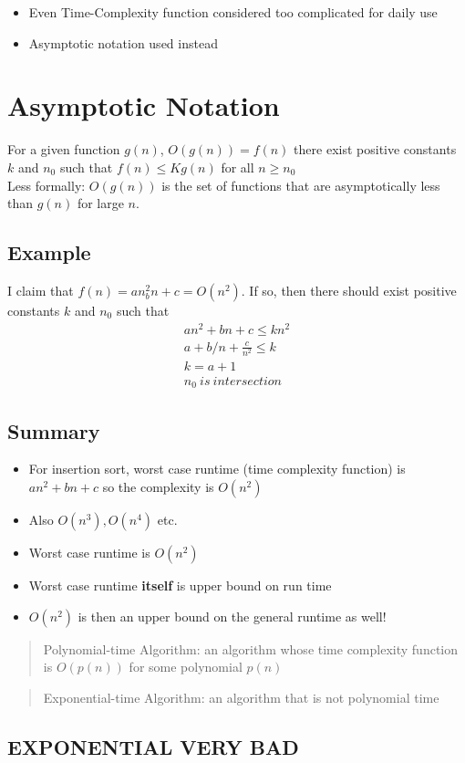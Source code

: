 \documentclass[12pt, letter]{article}
\begin{document}
\begin{itemize}
	\item Even Time-Complexity function considered too complicated for daily use
	\item Asymptotic notation used instead
\end{itemize}

\section{Asymptotic Notation}%
\label{sec:asymptotic_notation}
For a given function $g(n)$, $O(g(n))=f(n)$ there exist positive constants $k$ and  $n_0$ such that  $f(n) \le Kg(n)$ for all  $n \ge n_0$ \\
Less formally: $O(g(n))$ is the set of functions that are asymptotically less than $g(n)$ for large  $n$.

\subsection*{Example}
I claim that $f(n) = an^2_bn+c = O(n^2) $. If so, then there should exist positive constants $k$ and  $n_0$ such that
\begin{gather*}
an^2+bn+c \le kn^2 \\
a+b/n +\frac{c}{n^2} \le k \\
k = a+1 \\
n_0\ is\ intersection
\end{gather*}

\subsection*{Summary}
\begin{itemize}
	\item For insertion sort, worst case runtime (time complexity function) is $an^2+bn+c$ so the complexity is $O(n^2)$ \\
	\item Also $O(n^{3}), O(n^{4})$ etc.
	\item Worst case runtime is $O(n^2)$
	\item Worst case runtime \textbf{itself} is upper bound on run time
	\item $O(n^2)$ is then an upper bound on the general runtime as well!
\end{itemize}

\begin{quote}
	Polynomial-time Algorithm: an algorithm whose time complexity function is $O(p(n))$ for some polynomial $p(n)$
\end{quote}

\begin{quote}
	Exponential-time Algorithm: an algorithm that is not polynomial time
\end{quote}

\subsection*{EXPONENTIAL VERY BAD}
\end{document}
